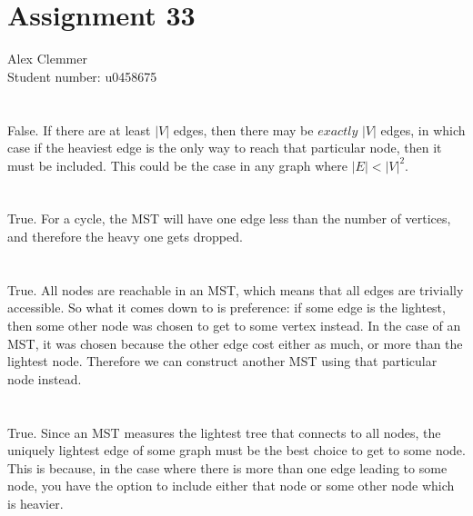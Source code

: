 \documentclass[a4paper]{article}
\begin{document}
\section*{Assignment 33}
Alex Clemmer\\
Student number: u0458675

\section{}

False. If there are at least $|V|$ edges, then there may be $\textit{exactly}$ $|V|$ edges, in which case if the heaviest edge is the only way to reach that particular node, then it must be included. This could be the case in any graph where $|E| < |V|^2$.

\section{}

True. For a cycle, the MST will have one edge less than the number of vertices, and therefore the heavy one gets dropped.

\section{}

True. All nodes are reachable in an MST, which means that all edges are trivially accessible. So what it comes down to is preference: if some edge is the lightest, then some other node was chosen to get to some vertex instead. In the case of an MST, it was chosen because the other edge cost either as much, or more than the lightest node. Therefore we can construct another MST using that particular node instead.

\section{}

True. Since an MST measures the lightest tree that connects to all nodes, the uniquely lightest edge of some graph must be the best choice to get to some node. This is because, in the case where there is more than one edge leading to some node, you have the option to include either that node or some other node which is heavier.

\section{}
\end{document}
